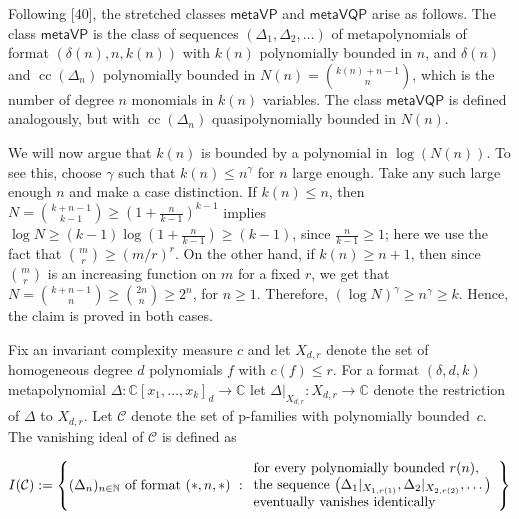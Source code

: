 Following [40], the stretched classes $\mathsf{metaVP}$ and $\mathsf{metaVQP}$ arise as follows.
The class $\mathsf{metaVP}$ is the class of sequences $(\Delta_{1},\Delta_{2},\ldots)$ of metapolynomials of format $(\delta(n),n,k(n))$ with $k(n)$ polynomially bounded in $n$, and $\delta(n)$ and $\operatorname{cc}(\Delta_{n})$ polynomially bounded in $N(n)=\binom{k(n)+n-1}{n}$, which is the number of degree $n$ monomials in $k(n)$ variables. The class $\mathsf{metaVQP}$ is defined analogously, but with $\operatorname{cc}(\Delta_{n})$ quasipolynomially bounded in $N(n)$.





We will now argue that $k(n)$ is bounded by a polynomial in $\log(N(n))$.
To see this, choose $\gamma$ such that $k(n)\leq n^{\gamma}$ for $n$ large enough.
Take any such large enough $n$ and make a case distinction.
If $k(n)\leq n$, then $N=\binom{k+n-1}{k-1}\geq(1+\frac{n}{k-1})^{k-1}$ implies $\log N\geq(k-1)\log(1+\frac{n}{k-1})\geq(k-1)$, since $\frac{n}{k-1}\geq 1$; here we use the fact that $\binom{m}{r}\geq(m/r)^{r}$.
On the other hand, if $k(n)\geq n+1$, then since $\binom{m}{r}$ is an increasing function on $m$ for a fixed $r$, we get that $N=\binom{k+n-1}{n}\geq\binom{2n}{n}\geq 2^{n}$, for $n\geq 1$.
Therefore, $(\log N)^{\gamma}\geq n^{\gamma}\geq k$.
Hence, the claim is proved in both cases.





Fix an invariant complexity measure $c$ and let $X_{d,r}$ denote the set of homogeneous degree $d$ polynomials $f$ with $c(f)\leq r$.
For a format $(\delta,d,k)$ metapolynomial $\Delta:\mathbb{C}[x_{1},\ldots,x_{k}]_{d}\to\mathbb{C}$ let $\Delta|_{X_{d,r}}:X_{d,r}\to\mathbb{C}$ denote the restriction of $\Delta$ to $X_{d,r}$.
Let $\mathcal{C}$ denote the set of p-families with polynomially bounded $c$.
The vanishing ideal of $\mathcal{C}$ is defined as





\[\begin{aligned}
\displaystyle I(\mathcal{C}):=\left\{(\Delta_{n})_{n\in\mathbb{N}}\textup{ of format $(\ast,n,\ast)$ }:\begin{array}[]{l}\text{for every polynomially bounded }r(n),\\ \text{the sequence }\big{(}\Delta_{1}|_{X_{1,r(1)}},\Delta_{2}|_{X_{2,r(2)}},\ldots\big{)}\\ \text{eventually vanishes identically}\end{array}\right\}
\end{aligned}\]





